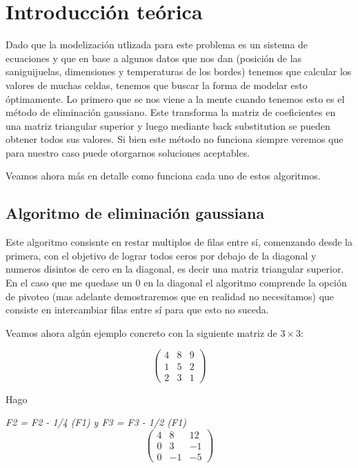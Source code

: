 \section{Introducci\'on te\'orica}

Dado que la modelización utlizada para este problema es un sistema de ecuaciones y que en base a algunos datos que nos dan (posición de las saniguijuelas, dimensiones y temperaturas de los bordes) tenemos que calcular los valores de muchas celdas, tenemos que buscar la forma de modelar esto óptimamente. 
Lo primero que se nos viene a la mente cuando tenemos esto es el método de eliminación gaussiano. Este transforma la matriz de coeficientes en una matriz triangular superior y luego mediante back substitution 
se pueden obtener todos sus valores. Si bien este método no funciona siempre veremos que para nuestro caso puede otorgarnos soluciones aceptables.

Veamos ahora más en detalle como funciona cada uno de estos algoritmos.

\subsection{Algoritmo de eliminación gaussiana}

Este algoritmo consisnte en restar multiplos de filas entre sí, comenzando desde la primera, con el objetivo de lograr todos ceros por debajo de la diagonal y numeros disintos de cero en la diagonal, 
es decir una matriz triangular superior. En el caso que me quedase un 0 en la diagonal el algoritmo comprende la opción de pivoteo (mas adelante demostraremos que en realidad no necesitamos) que consiste en intercambiar 
filas entre sí para que esto no suceda.

Veamos ahora algún ejemplo concreto con la siguiente matriz de $3 \times 3$:

\[ \left( \begin{array}{ccc}
4 & 8 & 9 \\
1 & 5 & 2 \\
2 & 3 & 1 \end{array} \right)\] 

Hago 

\emph{F2 = F2 - 1/4 (F1) y F3 = F3 - 1/2 (F1)} 
\[ \left( \begin{array}{ccc}
4 & 8 & 12 \\
0 & 3 & -1 \\
0 & -1 & -5 \end{array} \right)\] 

